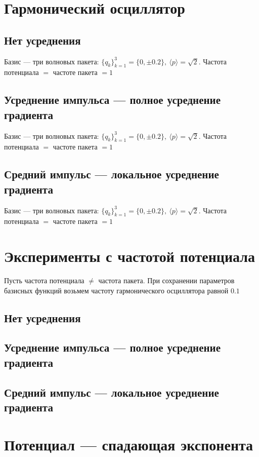 \documentclass[a4paper,14pt]{extarticle}
\begin{document}
\section{Гармонический осциллятор}

\subsection{Нет усреднения}


Базис --- три волновых пакета: $\{q_k\}_{k=1}^3 = \{0, \pm 0.2\},\ \langle p\rangle = \sqrt{2}$.
Частота потенциала $=$ частоте пакета $= 1$



\newpage

\subsection{Усреднение импульса --- полное усреднение градиента}


Базис --- три волновых пакета: $\{q_k\}_{k=1}^3 = \{0, \pm 0.2\},\ \langle p\rangle = \sqrt{2}$.
Частота потенциала $=$ частоте пакета $= 1$


\newpage

\subsection{Средний импульс --- локальное усреднение градиента}


Базис --- три волновых пакета: $\{q_k\}_{k=1}^3 = \{0, \pm 0.2\},\ \langle p\rangle = \sqrt{2}$.
Частота потенциала $=$ частоте пакета $= 1$


\newpage

\section{Эксперименты с частотой потенциала}
Пусть частота потенциала $\neq$ частота пакета. 
При сохранении параметров базисных функций возьмем частоту гармонического осциллятора равной $0.1$

\subsection{Нет усреднения}

\newpage

\subsection{Усреднение импульса --- полное усреднение градиента}

\newpage

\subsection{Средний импульс --- локальное усреднение градиента}


\section{Потенциал --- спадающая экспонента}



\end{document}

